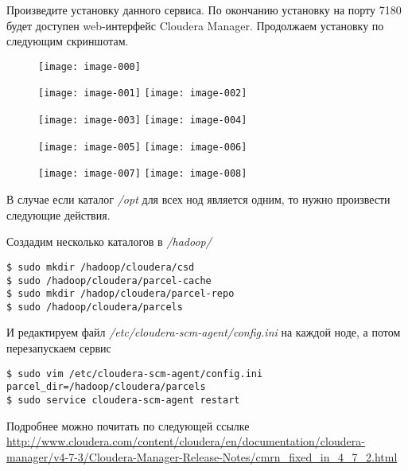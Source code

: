 Произведите установку данного сервиса. По окончанию установку на порту 7180 будет доступен web-интерфейс 
Cloudera Manager. Продолжаем установку по следующим скриншотам.

\begin{figure}[ht!]
    \center
    \texttt{[image: image-000]}
\end{figure}

\newpage

\begin{figure}[ht!]
    \center
    \texttt{[image: image-001]}
    \texttt{[image: image-002]}
\end{figure}

\newpage

\begin{figure}[ht!]
    \center
    \texttt{[image: image-003]}
    \texttt{[image: image-004]}
\end{figure}

\newpage

\begin{figure}[ht!]
    \center
    \texttt{[image: image-005]}
    \texttt{[image: image-006]}
\end{figure}

\newpage

\begin{figure}[ht!]
    \center
    \texttt{[image: image-007]}
    \texttt{[image: image-008]}
\end{figure}

В случае если каталог \emph{/opt} для всех нод является одним, то нужно произвести следующие действия.

Создадим несколько каталогов в \emph{/hadoop/}
\begin{lstlisting}
$ sudo mkdir /hadoop/cloudera/csd
$ sudo /hadoop/cloudera/parcel-cache
$ sudo mkdir /hadop/cloudera/parcel-repo
$ sudo /hadoop/cloudera/parcels
\end{lstlisting}
И редактируем файл \emph{/etc/cloudera-scm-agent/config.ini} на каждой ноде, а потом перезапускаем сервис
\begin{lstlisting}
$ sudo vim /etc/cloudera-scm-agent/config.ini
parcel_dir=/hadoop/cloudera/parcels
$ sudo service cloudera-scm-agent restart
\end{lstlisting}
Подробнее можно почитать по следующей ссылке \url{http://www.cloudera.com/content/cloudera/en/documentation/cloudera-manager/v4-7-3/Cloudera-Manager-Release-Notes/cmrn_fixed_in_4_7_2.html}

